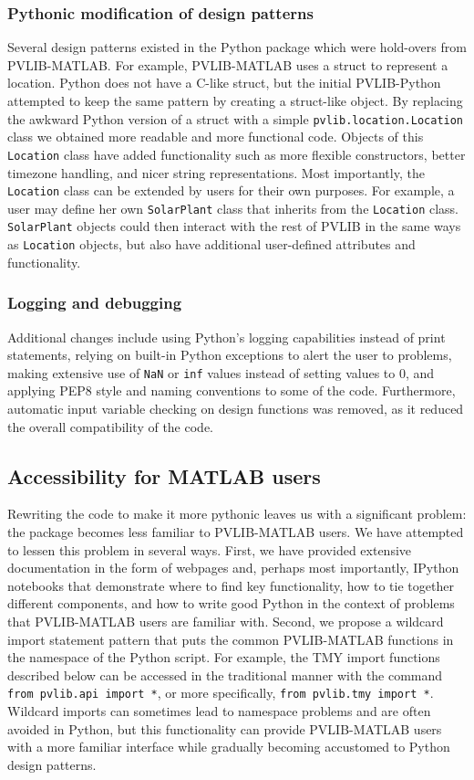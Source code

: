 \documentclass[conference]{IEEEtran}
\begin{document}
\subsubsection{Pythonic modification of design patterns}
Several design patterns existed in the Python package which were hold-overs from PVLIB-MATLAB. 
For example, PVLIB-MATLAB uses a struct to represent a location. 
Python does not have a C-like struct, but the initial PVLIB-Python attempted to keep the same pattern by creating a struct-like object.
By replacing the awkward Python version of a struct with a simple \texttt{pvlib.location.Location} class we obtained more readable and more functional code.
Objects of this \texttt{Location} class have added functionality such as more flexible constructors, better timezone handling, and nicer string representations.
Most importantly, the \texttt{Location} class can be extended by users for their own purposes.
For example, a user may define her own \texttt{SolarPlant} class that inherits from the \texttt{Location} class. 
\texttt{SolarPlant} objects could then interact with the rest of PVLIB in the same ways as \texttt{Location} objects, but also have additional user-defined attributes and functionality.


\subsubsection{Logging and debugging}
Additional changes include using Python's logging capabilities instead of print statements, relying on built-in Python exceptions to alert the user to problems, making extensive use of \texttt{NaN} or \texttt{inf} values instead of setting values to 0, and applying PEP8 style and naming conventions \cite{pep8} to some of the code. 
Furthermore, automatic input variable checking on design functions was removed, as it reduced the overall compatibility of the code. 

\subsection{Accessibility for MATLAB users}
Rewriting the code to make it more pythonic leaves us with a significant problem: the package becomes less familiar to PVLIB-MATLAB users. 
We have attempted to lessen this problem in several ways.
First, we have provided extensive documentation in the form of webpages and, perhaps most importantly, IPython notebooks that demonstrate where to find key functionality, how to tie together different components, and how to write good Python in the context of problems that PVLIB-MATLAB users are familiar with.
Second, we propose a wildcard import statement pattern that puts the common PVLIB-MATLAB functions in the namespace of the Python script. 
For example, the TMY import functions described below can be accessed in the traditional manner with the command \texttt{from pvlib.api import *}, or more specifically, \texttt{from pvlib.tmy import *}. 
Wildcard imports can sometimes lead to namespace problems and are often avoided in Python, but this functionality can provide PVLIB-MATLAB users with a more familiar interface while gradually becoming accustomed to Python design patterns.
\end{document}
